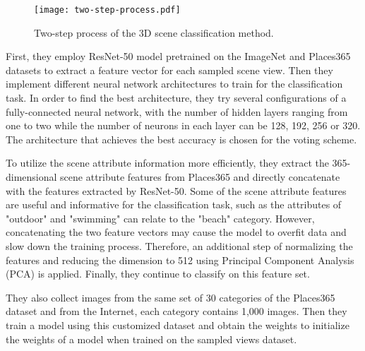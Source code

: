 \documentclass[../main.tex]{subfiles}
\begin{document}
	\begin{figure}
		\centering
		\texttt{[image: two-step-process.pdf]}
		\caption{Two-step process of the 3D scene classification method.}
		\label{fig:3D overview}
	\end{figure}
	
	First, they employ ResNet-50\cite{resnet} model pretrained on the  
	ImageNet\cite{ImageNet} and Places365\cite{zhou2017places} datasets to 
	extract a feature vector for each sampled scene view. Then they implement 
	different neural network architectures to train for the classification 
	task. In order to find the best architecture, they try several 
	configurations of a fully-connected neural network, with the number of 
	hidden layers ranging from one to two while the number of neurons in each 
	layer can be 128, 192, 256 or 320. The architecture that achieves 
	the best accuracy is chosen for the voting scheme.
	
	To utilize the scene attribute information more efficiently, they extract 
	the 365-dimensional scene attribute features from Places365 and directly concatenate with the features extracted by ResNet-50. Some of the scene attribute features are 
	useful and informative for the classification task, such as the attributes 
	of "outdoor" and "swimming" can relate to the "beach" category. However, 
	concatenating the two feature vectors may cause the model to overfit data 
	and slow down the training process. Therefore, an additional step of 
	normalizing the features and reducing the dimension to 512 using Principal 
	Component Analysis (PCA) is applied. Finally, they continue to classify on 
	this feature set.
	
	They also collect images from the same set of 30 categories of the 
	Places365 dataset and from the Internet, each category contains 1,000 
	images. Then they train a model using this customized dataset and obtain 
	the weights to initialize the weights of a model when trained on the 
	sampled views dataset.
	
\end{document}
